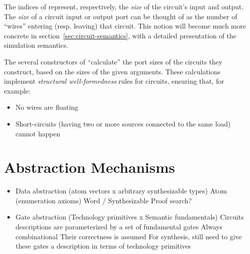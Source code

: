         The indices of  represent, respectively, the \emph{size} of the circuit's input and output.
        The \emph{size} of a circuit input or output port can be thought of
        as the number of ``wires'' entering (resp. leaving) that circuit.
        This notion will become much more concrete in section~\ref{sec:circuit-semantics}, with
        a detailed presentation of the simulation semantics.

        The several constructors of  ``calculate'' the port sizes of the circuits they construct,
        based on the sizes of the given arguments.
        These calculations implement \emph{structural well-formedness} rules for circuits,
        ensuring that, for example:

        \begin{itemize}
            \item No wires are floating
            \item Short-circuits (having two or more sources connected to the same load) cannot happen
        \end{itemize}


    \section{Abstraction Mechanisms}
    \label{sec:circuit-abstraction}
        \begin{itemize}
            \item Data abstraction (atom vectors x arbitrary synthesizable types)
                \subitem Atom (enumeration axioms)
                \subitem Word / Synthesizable
                    \subsubitem Proof search?
            \item Gate abstraction (Technology primitives x Semantic fundamentals)
                \subitem Circuits descriptions are parameterized by a set of fundamental gates
                    \subsubitem Always combinational
                    \subsubitem Their correctness is assumed
                \subitem For synthesis, still need to give these gates a description in terms of technology primitives
        \end{itemize}

